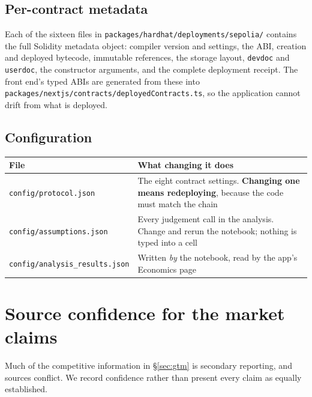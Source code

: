 \documentclass[11pt,a4paper]{article}
\begin{document}
\subsection{Per-contract metadata}

Each of the sixteen files in \texttt{packages/hardhat/deployments/sepolia/} contains the full
Solidity metadata object: compiler version and settings, the ABI, creation and deployed bytecode,
immutable references, the storage layout, \texttt{devdoc} and \texttt{userdoc}, the constructor
arguments, and the complete deployment receipt. The front end's typed ABIs are generated from these
into \texttt{packages/nextjs/contracts/deployedContracts.ts}, so the application cannot drift from
what is deployed.

\subsection{Configuration}

\begin{center}
\small
\begin{tabular}{@{}p{4.4cm}p{10.8cm}@{}}
\toprule
\textbf{File} & \textbf{What changing it does} \\
\midrule
\texttt{config/protocol.json} & The eight contract settings. \textbf{Changing one means redeploying}, because the code must match the chain \\
\texttt{config/assumptions.json} & Every judgement call in the analysis. Change and rerun the notebook; nothing is typed into a cell \\
\nolinkurl{config/analysis_results.json} & Written \emph{by} the notebook, read by the app's Economics page \\
\bottomrule
\end{tabular}
\end{center}

\section{Source confidence for the market claims}\label{app:sources}

Much of the competitive information in \S\ref{sec:gtm} is secondary reporting, and sources conflict.
We record confidence rather than present every claim as equally established.
\end{document}
